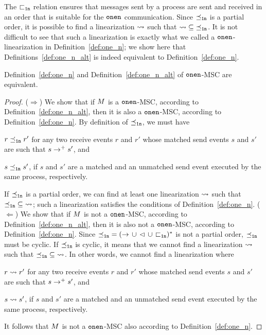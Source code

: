 The ${\sqsubset_{\mathtt{1n}}}$ relation ensures that messages sent by a process are sent and received in an order that is suitable for the $\mathtt{onen}$ communication. Since ${\preceq_{\mathtt{1n}}}$ is a partial order, it is possible to find a linearization $\rightsquigarrow$ such that $\rightsquigarrow \;\subseteq\; \preceq_{\mathtt{1n}}$. It is not difficult to see that such a linearization is exactly what we called a $\mathtt{onen}$-linearization in Definition~\ref{def:one_n}; we show here that Definitions~\ref{def:one_n_alt} is indeed equivalent to Definition~\ref{def:one_n}.

\begin{proposition}
    Definition~\ref{def:one_n} and Definition~\ref{def:one_n_alt} of $\mathtt{onen}$-MSC are equivalent.
\end{proposition}
\begin{proof}
    ($\Rightarrow$)  We show that if $M$ is a $\mathtt{onen}$-MSC, according to Definition~\ref{def:one_n_alt}, then it is also a $\mathtt{onen}$-MSC, according to Definition~\ref{def:one_n}. By definition of $\preceq_{\mathtt{1n}}$, we must have 
    \begin{enumerate*}[label={(\roman*)}]
        \item $r \preceq_{\mathtt{1n}} r'$ for any two receive events $r$ and $r'$ whose matched send events $s$ and $s'$ are such that $s \to^+ s'$, and
        \item $s \preceq_{\mathtt{1n}} s'$, if $s$ and $s'$ are a matched and an unmatched send event executed by the same process, respectively.
    \end{enumerate*} 
    If $\preceq_{\mathtt{1n}}$ is a partial order, we can find at least one linearization $\rightsquigarrow$ such that $\preceq_{\mathtt{1n}} \;\subseteq\; \rightsquigarrow$; such a linearization satisfies the conditions of Definition~\ref{def:one_n}.\newline
    ($\Leftarrow$) We show that if $M$ is not a $\mathtt{onen}$-MSC, according to Definition~\ref{def:one_n_alt}, then it is also not a $\mathtt{onen}$-MSC, according to Definition~\ref{def:one_n}. Since ${\preceq_{\mathtt{1n}}} = ({\to} \,\cup\, {\lhd} \,\cup\, {\sqsubset_{\mathtt{1n}}})^\ast$ is not a partial order, $\preceq_{\mathtt{1n}}$ must be cyclic. If $\preceq_{\mathtt{1n}}$ is cyclic, it means that we cannot find a linearization $\rightsquigarrow$ such that $\preceq_{\mathtt{1n}} \;\subseteq\; \rightsquigarrow$. In other words, we cannot find a linearization where      
    \begin{enumerate*}[label={(\roman*)}]
        \item $r \rightsquigarrow r'$ for any two receive events $r$ and $r'$ whose matched send events $s$ and $s'$ are such that $s \to^+ s'$, and
        \item $s \rightsquigarrow s'$, if $s$ and $s'$ are a matched and an unmatched send event executed by the same process, respectively.
    \end{enumerate*} 
    It follows that $M$ is not a $\mathtt{onen}$-MSC also according to Definition~\ref{def:one_n}.
\end{proof}


